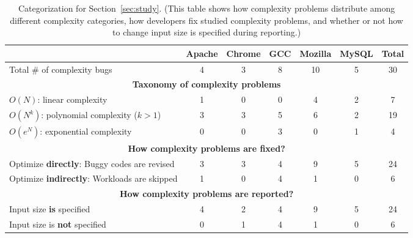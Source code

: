 \begin{table}[tb!]
\begin{adjustwidth}{-.5in}{-.5in}
\small
\centering
{
\begin{tabular}{|lcccccc|}
\hline
                                                                                  &   Apache  &   Chrome   &  GCC   &    Mozilla   &   MySQL  &  Total\\
\hline
Total \# of complexity bugs                                                       &   4       &    3       &   8    &    10        &   5      &   30 \\
\hline
\multicolumn{7}{|c|}{\bf Taxonomy of complexity problems}\\
\multicolumn{1}{|l}{{\bf $O(N)$}: linear complexity}                              &   1       &    0       &   0    &    4         &   2      &   7\\
\multicolumn{1}{|l}{{\bf $O(N^k)$}: polynomial complexity ($k>1$)}                &   3       &    3       &   5    &    6         &   2      &  19\\
\multicolumn{1}{|l}{{\bf $O(e^N)$}: exponential complexity}                       &   0       &    0       &   3    &    0         &   1      &   4\\
\hline
\multicolumn{7}{|c|}{\bf How complexity problems are fixed?}\\
\multicolumn{1}{|l}{Optimize {\bf directly}: Buggy codes are revised}              &  3        &    3       &   4    &    9         &   5      &  24 \\
\multicolumn{1}{|l}{Optimize {\bf indirectly}: Workloads are skipped}              &  1        &    0       &   4    &    1         &   0      &   6\\
\hline
\multicolumn{7}{|c|}{\bf How complexity problems are reported?}\\
\multicolumn{1}{|l}{Input size {\bf is} specified}                                &  4        &    2       &   4    &    9    &5   &24\\
\multicolumn{1}{|l}{Input size is {\bf not} specified}                            &  0        &    1       &   4    &    1    &0   &6\\
\hline
\end{tabular}
}
\end{adjustwidth}
\caption{Categorization for Section~\ref{sec:study}.
\footnotesize{(This table shows how complexity problems distribute among different complexity categories, how developers fix studied complexity problems,  
 and whether or not how to change input size is specified during reporting.)}}
\label{tab:study}
\vspace{-0.4in}
\end{table}